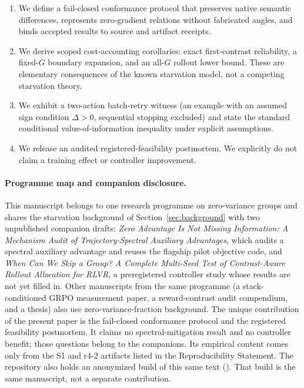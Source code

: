 \documentclass{article}
\begin{document}
\begin{enumerate}[leftmargin=*,itemsep=2pt]
  \item We define a fail-closed conformance protocol that preserves native
  semantic differences, represents zero-gradient relations without fabricated
  angles, and binds accepted results to source and artifact receipts.
  \item We derive scoped cost-accounting corollaries: exact first-contrast
  reliability, a fixed-$G$ boundary expansion, and an all-$G$ rollout lower
  bound.  These are elementary consequences of the known starvation model,
  not a competing starvation theory.
  \item We exhibit a two-action batch-retry witness (an example with an
  assumed sign condition $\Delta>0$, sequential stopping excluded) and state
  the standard conditional value-of-information inequality under explicit
  assumptions.
  \item We release an audited registered-feasibility postmortem.  We explicitly
  do not claim a training effect or controller improvement.
\end{enumerate}

\paragraph{Programme map and companion disclosure.}
This manuscript belongs to one research programme on zero-variance groups and
shares the starvation background of Section~\ref{sec:background} with two
unpublished companion drafts: \emph{Zero Advantage Is Not Missing
Information: A Mechanism Audit of Trajectory-Spectral Auxiliary Advantages},
which audits a spectral auxiliary advantage and reuses the flagship pilot
objective code, and \emph{When Can We Skip a Group? A Complete Multi-Seed Test
of Contrast-Aware Rollout Allocation for RLVR}, a preregistered controller
study whose results are not yet filled in.  Other manuscripts from the same
programme (a stack-conditioned GRPO measurement paper, a reward-contrast audit
compendium, and a thesis) also use zero-variance-fraction background.  The
unique contribution of the present paper is the fail-closed conformance
protocol and the registered feasibility postmortem.  It claims no
spectral-mitigation result and no controller benefit; those questions belong
to the companions.  Its empirical content comes only from the S1 and r4-2
artifacts listed in the Reproducibility Statement.  The repository also holds
an anonymized build of this same text ().  That build
is the same manuscript, not a separate contribution.
\end{document}
